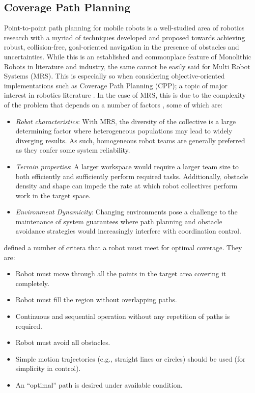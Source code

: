 \documentclass{report}
\begin{document}
\subsection{Coverage Path Planning}
Point-to-point path planning for mobile robots is a well-studied area of robotics research with a myriad of techniques developed and proposed towards achieving robust, collision-free, goal-oriented navigation in the presence of obstacles and uncertainties. While this is an established and commonplace feature of Monolithic Robots in literature and industry, the same cannot be easily said for Multi Robot Systems (MRS). This is especially so when considering objective-oriented implementations such as Coverage Path Planning (CPP); a topic of major interest in robotics literature \cite{Macas2009}. In the case of MRS, this is due to the complexity of the problem that depends on a number of factors \cite{Yan2014}, some of which are:
\begin{itemize}
 \item \textit{Robot characteristics}: With MRS, the diversity of the collective is a large determining factor where heterogeneous populations may lead to widely diverging results. As such, homogeneous robot teams are generally preferred as they confer some system reliability.
 \item \textit{Terrain properties}: A larger workspace would require a larger team size to both efficiently and sufficiently perform required tasks. Additionally, obstacle density and shape can impede the rate at which robot collectives perform work in the target space.
 \item \textit{Environment Dynamicity}: Changing environments pose a challenge to the maintenance of system guarantees where path planning and obstacle avoidance strategies would increasingly interfere with coordination control.
\end{itemize}

\cite{Cao1988} defined a number of critera that a robot must meet for optimal coverage. They are:
\begin{itemize}
	\item Robot must move through all the points in the target area covering it completely.
	\item Robot must fill the region without overlapping paths.
	\item Continuous and sequential operation without any repetition of paths is required.
	\item Robot must avoid all obstacles.
	\item Simple motion trajectories (e.g., straight lines or circles) should be used (for simplicity in control).
	\item An “optimal” path is desired under available condition.
\end{itemize}
\end{document}
